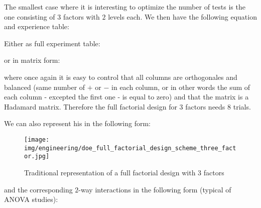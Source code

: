 	The smallest case where it is interesting to optimize the number of tests is the one consisting of $3$ factors with $2$ levels each. We then have the following equation and experience table:
	
	
	Either as full experiment table:
	
	or in matrix form:
	
	where once again it is easy to control that all columns are orthogonales and balanced (same number of $+$ or $-$ in each column, or in other words the sum of each column - excepted the first one - is equal to zero) and that the matrix is a Hadamard matrix.	 Therefore the full factorial design for $3$ factors needs $8$ trials.

	We can also represent his in the following form:
	\begin{figure}[H]
		\begin{center}
		\texttt{[image: img/engineering/doe\_full\_factorial\_design\_scheme\_three\_factor.jpg]}
		\end{center}	
		\caption{Traditional representation of a full factorial design with $3$ factors}
	\end{figure}
	and the corresponding $2$-way interactions in the following form (typical of ANOVA studies):
	\newcommand\drawplane[2]
	{%
	    \draw
	    [
	        thick,
	        opacity=.6,
	        draw=#2,
	        fill=#2!60,
	    ] #1 -- cycle;%
	}
	
